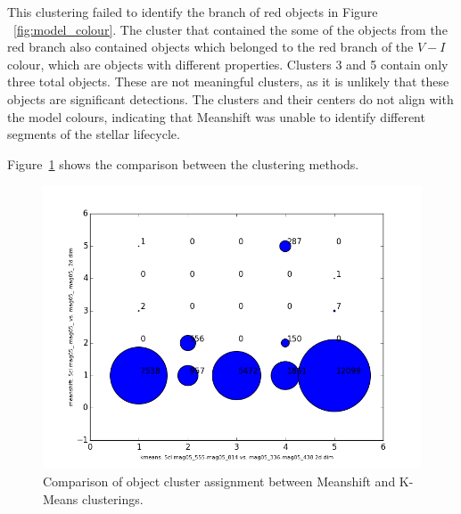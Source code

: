 This clustering failed to identify the branch of red objects in Figure ~\ref{fig:model_colour}.
The cluster that contained the some of the objects from the red branch also contained objects which belonged to the red branch of the $V - I$ colour, which are objects with different properties.
Clusters 3 and 5 contain only three total objects. 
These are not meaningful clusters, as it is unlikely that these objects are significant detections.
The clusters and their centers do not align with the model colours, indicating that Meanshift was unable to identify different segments of the stellar lifecycle.

Figure~\ref{fig:BB2dMSKMcomp} shows the comparison between the clustering methods.

\begin{figure}[H]
\centering
\includegraphics[width=\linewidth]{figs/broad/kmeans-5cl_mag05_555-mag05_814_vs_meanshift-5cl_mag05_-mag05__mag05_-mag05__2ddim_compare}
\caption{Comparison of object cluster assignment between Meanshift and K-Means clusterings.}
\label{fig:BB2dMSKMcomp}
\end{figure}

